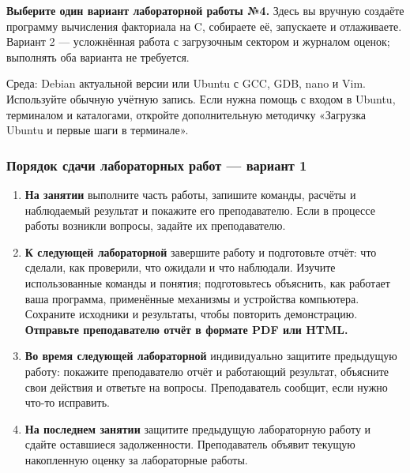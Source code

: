 \textbf{Выберите один вариант лабораторной работы №4.} Здесь вы вручную
создаёте программу вычисления факториала на C, собираете её, запускаете
и отлаживаете. Вариант 2 --- усложнённая работа с загрузочным сектором и
журналом оценок; выполнять оба варианта не требуется.

Среда: Debian актуальной версии или Ubuntu с GCC, GDB, nano и Vim.
Используйте обычную учётную запись. Если нужна помощь с входом в Ubuntu,
терминалом и каталогами, откройте дополнительную методичку «Загрузка
Ubuntu и первые шаги в терминале».

\hypertarget{ux43fux43eux440ux44fux434ux43eux43a-ux441ux434ux430ux447ux438-ux43bux430ux431ux43eux440ux430ux442ux43eux440ux43dux44bux445-ux440ux430ux431ux43eux442--ux432ux430ux440ux438ux430ux43dux442-1}{%
\subsubsection{Порядок сдачи лабораторных работ --- вариант
1}\label{ux43fux43eux440ux44fux434ux43eux43a-ux441ux434ux430ux447ux438-ux43bux430ux431ux43eux440ux430ux442ux43eux440ux43dux44bux445-ux440ux430ux431ux43eux442--ux432ux430ux440ux438ux430ux43dux442-1}}

\begin{enumerate}
\def\labelenumi{\arabic{enumi}.}
\tightlist
\item
  \textbf{На занятии} выполните часть работы, запишите команды, расчёты
  и наблюдаемый результат и покажите его преподавателю. Если в процессе
  работы возникли вопросы, задайте их преподавателю.
\item
  \textbf{К следующей лабораторной} завершите работу и подготовьте
  отчёт: что сделали, как проверили, что ожидали и что наблюдали.
  Изучите использованные команды и понятия; подготовьтесь объяснить,
  как работает ваша программа, применённые механизмы и устройства компьютера.
  Сохраните исходники и результаты, чтобы повторить демонстрацию.
  \textbf{Отправьте преподавателю отчёт в формате PDF или HTML.}
\item
  \textbf{Во время следующей лабораторной} индивидуально защитите
  предыдущую работу: покажите преподавателю отчёт и работающий
  результат, объясните свои действия и ответьте на вопросы. Преподаватель
  сообщит, если нужно что-то исправить.
\item
  \textbf{На последнем занятии} защитите предыдущую лабораторную работу
  и сдайте оставшиеся задолженности. Преподаватель объявит текущую
  накопленную оценку за лабораторные работы.
\end{enumerate}

